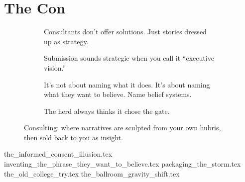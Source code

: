 \section{The Con}
\vfill

\begin{figure}[H]
  \centering

  \begin{subfigure}[t]{0.45\textwidth}
  \centering
  \caption*{Consultants don’t offer solutions. Just stories dressed up as strategy.}
  \end{subfigure}
  \hfill
  \begin{subfigure}[t]{0.45\textwidth}
  \centering
  \caption*{Submission sounds strategic when you call it ``executive vision.''}
  \end{subfigure}

  \vspace{1em}

  \begin{subfigure}[t]{0.45\textwidth}
  \centering
  \caption*{It’s not about naming what it does. It’s about naming what they want to believe. Name belief systems.}
  \end{subfigure}
  \hfill
  \begin{subfigure}[t]{0.45\textwidth}
  \centering
  \caption*{The herd always thinks it chose the gate.}
  \end{subfigure}

  \caption*{Consulting: where narratives are sculpted from your own hubris, then sold back 
  to you as insight.}
\end{figure}

{the_informed_consent_illusion.tex}
{inventing_the_phrase_they_want_to_believe.tex}
{packaging_the_storm.tex}
{the_old_college_try.tex}
{the_ballroom_gravity_shift.tex}